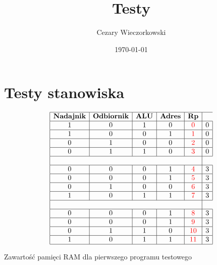 \documentclass[../main.tex]{subfiles}
\author{Cezary Wieczorkowski}
\date{\today}
\title{Testy}
\begin{document}
\section{Testy stanowiska}

    \begin{table}[ht]
        \[
        \begin{array}{|c|c|c|c|c|c|}
        \hline
        \textbf{Nadajnik} & \textbf{Odbiornik} & \textbf{ALU} & \textbf{Adres} & \textbf{Rp} \\ \hline
        1 & 0 & 1 & 0 & \textcolor{red}{0} & 0 \\ \hline
        1 & 0 & 0 & 1 & \textcolor{red}{1} & 0 \\ \hline
        0 & 1 & 0 & 0 & \textcolor{red}{2} & 0 \\ \hline
        0 & 1 & 1 & 0 & \textcolor{red}{3} & 0 \\ \hline
        \multicolumn{5}{|c|}{} \\ \hline
        0 & 0 & 0 & 1 & \textcolor{red}{4} & 3 \\ \hline
        0 & 0 & 0 & 1 & \textcolor{red}{5} & 3 \\ \hline
        0 & 1 & 0 & 0 & \textcolor{red}{6} & 3 \\ \hline
        1 & 0 & 1 & 1 & \textcolor{red}{7} & 3 \\ \hline
        \multicolumn{5}{|c|}{} \\ \hline
        0 & 0 & 0 & 1 & \textcolor{red}{8} & 3 \\ \hline
        0 & 0 & 0 & 1 & \textcolor{red}{9} & 3 \\ \hline
        0 & 1 & 1 & 0 & \textcolor{red}{10} & 3 \\ \hline
        1 & 0 & 1 & 1 & \textcolor{red}{11} & 3 \\ \hline
        \end{array}
        \]
        \caption{Zawartość pamięci RAM dla pierwszego programu testowego}
    \end{table}
\end{document}
